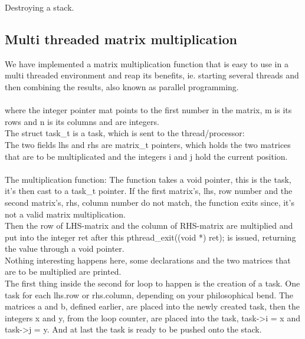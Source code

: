         {Destroying a stack.}

\subsection{Multi threaded matrix multiplication}
We have implemented a matrix multiplication function that is easy to use in a
multi threaded environment and reap its benefits, ie. starting several threads
and then combining the results, also known as parallel programming.\\
\\
where the integer pointer \textsf{mat} points to the first number in the matrix,
\textsf{m} is its rows and \textsf{n} is its columns and are integers.\\
The \textsf{struct task\_t} is a task, which is sent to the thread/processor:\\
The two fields \textsf{lhs} and \textsf{rhs} are matrix\_t pointers, which holds the two
matrices that are to be multiplicated and the integers \textsf{i} and \textsf{j} hold
the current position.\\
\\
The multiplication function:
The function takes a void pointer, this is the task, it's then cast to a task\_t
pointer. If the first matrix's, lhs, row number and the second matrix's, rhs,
column number do not match, the function exits since, it's not a valid matrix
multiplication.\\
Then the row of LHS-matrix and the column of RHS-matrix are multiplied and
put into the integer \textsf{ret} after this \textsf{pthread\_exit((void *)
ret);} is issued, returning the value through a void pointer.\\

Nothing interesting happens here, some declarations and the two matrices that
are to be multiplied are printed.\\

The first thing inside the second for loop to happen is the creation of a task.
One task for each lhs.row or rhs.column, depending on your philosophical bend.
The matrices a and b, defined earlier, are placed into the newly created task,
then the integers \textsf{x} and \textsf{y}, from the loop counter, are placed
into the task, \textsf{task->i = x} and \textsf{task->j = y}. And at last the
task is ready to be pushed onto the stack.\\

